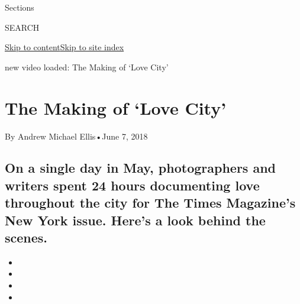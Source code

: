 Sections

SEARCH

\protect\hyperlink{site-content}{Skip to
content}\protect\hyperlink{site-index}{Skip to site index}

new video loaded: The Making of `Love City'

\hypertarget{the-making-of-love-city}{%
\section{The Making of `Love City'}\label{the-making-of-love-city}}

By Andrew Michael Ellis•June 7, 2018

\hypertarget{on-a-single-day-in-may-photographers-and-writers-spent-24-hours-documenting-love-throughout-the-city-for-the-times-magazines-new-york-issue-heres-a-look-behind-the-scenes}{%
\subsection{On a single day in May, photographers and writers spent 24
hours documenting love throughout the city for The Times Magazine's New
York issue. Here's a look behind the
scenes.}\label{on-a-single-day-in-may-photographers-and-writers-spent-24-hours-documenting-love-throughout-the-city-for-the-times-magazines-new-york-issue-heres-a-look-behind-the-scenes}}

\begin{itemize}
\item
\item
\item
\item
\end{itemize}

